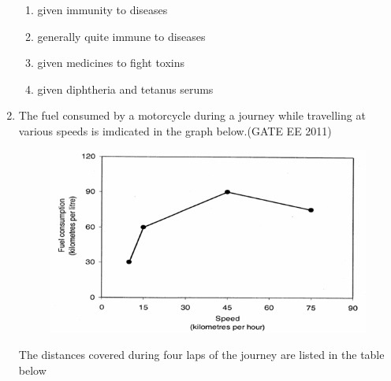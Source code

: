 \documentclass[a4paper,10pt]{exam}
\theoremstyle{remark}
\begin{document}
\begin{enumerate}
\begin{enumerate}
\item given immunity to diseases
\item generally quite immune to diseases
\item given medicines to fight toxins
\item given diphtheria and tetanus serums
\end{enumerate}
\item The fuel consumed by a motorcycle during a journey while travelling at various speeds is imdicated in the graph below.\hfill{(GATE EE 2011)}
\begin{figure}[H]
    \centering
    \includegraphics[width=0.6\columnwidth]{figs/Q 63.png}\caption{}     \label{fig:myfigure}
\end{figure}
The distances covered during four laps of the journey are listed in the table below\\


\end{enumerate}
\end{document}
